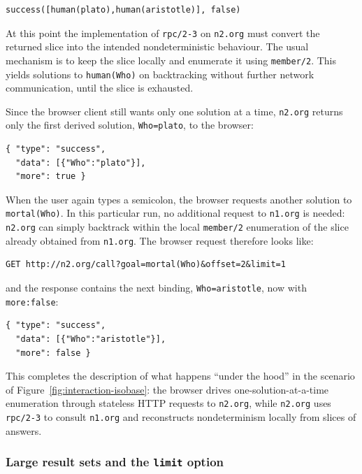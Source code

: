 \begin{verbatim}
success([human(plato),human(aristotle)], false)
\end{verbatim}

\noindent At this point the implementation of \texttt{rpc/2-3} on \texttt{n2.org} must convert the returned slice into the intended nondeterministic behaviour. The usual mechanism is to keep the slice locally and enumerate it using \texttt{member/2}. This yields solutions to \texttt{human(Who)} on backtracking without further network communication, until the slice is exhausted.

Since the browser client still wants only one solution at a time, \texttt{n2.org} returns only the first derived solution, \texttt{Who=plato}, to the browser:

\begin{verbatim}
{ "type": "success",
  "data": [{"Who":"plato"}],
  "more": true }
\end{verbatim}


\noindent When the user again types a semicolon, the browser requests another solution to \texttt{mortal(Who)}. In this particular run, no additional request to \texttt{n1.org} is needed: \texttt{n2.org} can simply backtrack within the local \texttt{member/2} enumeration of the slice already obtained from \texttt{n1.org}. The browser request therefore looks like:

\begin{verbatim}
GET http://n2.org/call?goal=mortal(Who)&offset=2&limit=1
\end{verbatim}

\noindent and the response contains the next binding, \texttt{Who=aristotle}, now with \texttt{more:false}:

\begin{verbatim}
{ "type": "success",
  "data": [{"Who":"aristotle"}],
  "more": false }
\end{verbatim}

\noindent This completes the description of what happens ``under the hood'' in the scenario of Figure~\ref{fig:interaction-isobase}: the browser drives one-solution-at-a-time enumeration through stateless HTTP requests to \texttt{n2.org}, while \texttt{n2.org} uses \texttt{rpc/2-3} to consult \texttt{n1.org} and reconstructs nondeterminism locally from slices of answers.



\subsubsection{Large result sets and the \texttt{limit} option}

